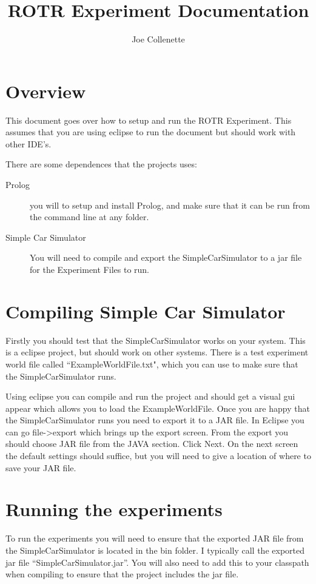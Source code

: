 \documentclass{article}
\title{ROTR Experiment Documentation}
\author{Joe Collenette}
\date{}
\begin{document}
\maketitle

\section{Overview}
This document goes over how to setup and run the ROTR Experiment.
This assumes that you are using eclipse to run the document but should work with other IDE's.

There are some dependences that the projects uses:
\begin{description}
    \item[Prolog] you will to setup and install Prolog, and make sure that it can be run from the command line at any folder.
    \item[Simple Car Simulator] You will need to compile and export the SimpleCarSimulator to a jar file for the Experiment Files to run.
\end{description}

\section{Compiling Simple Car Simulator}
Firstly you should test that the SimpleCarSimulator works on your system.
This is a eclipse project, but should work on other systems.
There is a test experiment world file called ``ExampleWorldFile.txt", which you can use to make sure that the SimpleCarSimulator runs.

Using eclipse you can compile and run the project and should get a visual gui appear which allows you to load the ExampleWorldFile.
Once you are happy that the SimpleCarSimulator runs you need to export it to a JAR file.
In Eclipse you can go file->export which brings up the export screen.
From the export you should choose JAR file from the JAVA section.
Click Next. On the next screen the default settings should suffice, but you will need to give a location of where to save your JAR file.

\section{Running the experiments}
To run the experiments you will need to ensure that the exported JAR file from the SimpleCarSimulator is located in the bin folder.
I typically call the exported jar file ``SimpleCarSimulator.jar''.
You will also need to add this to your classpath when compiling to ensure that the project includes the jar file.
\end{document}
